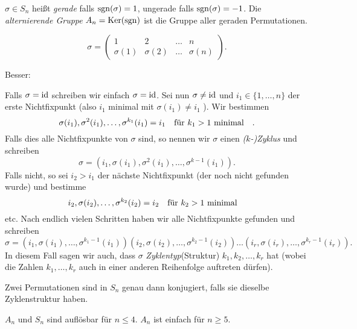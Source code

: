 \begin{definition}
	$\sigma \in S_{n}$ heißt \emph{gerade} falls $\operatorname{sgn}(\sigma) = 1$, ungerade falls $\operatorname{sgn}(\sigma) = -1$.
	Die \emph{alternierende Gruppe} $A_{n} = \operatorname{Ker}(\operatorname{sgn})$ ist die Gruppe aller geraden Permutationen.
\end{definition}


\begin{notation}
	\[
	\sigma = \begin{pmatrix} 
		1 & 2 & \ldots & n\\
		\sigma(1) & \sigma(2) & \ldots & \sigma(n)
	\end{pmatrix} 
	.\] 
\end{notation}
Besser:
\begin{notation}
	Falls $\sigma = \operatorname{id}$ schreiben wir einfach $\sigma = \operatorname{id}$.
	Sei nun $\sigma \neq \operatorname{id}$ und $i_1 \in \{1,\ldots,n\} $ der erste Nichtfixpunkt (also $i_{1}$ minimal mit $\sigma(i_1) \neq i_1$ ).
	Wir bestimmen
	\[
		\sigma(i_1) , \sigma^2(i_1),\ldots, \sigma^{k_1}(i_1) = i_1 \qq{für $k_1 > 1$ minimal}
	.\] 
	Falls dies alle Nichtfixpunkte von $\sigma$ sind, so nennen wir $\sigma$ einen \emph{($k$-)Zyklus} und schreiben
	 \[
		 \sigma = (i_1,\sigma(i_1),\sigma^2(i_1),\ldots,\sigma^{k-1}(i_1))
	.\] 
	Falls nicht, so sei $i_2 > i_1$ der nächste Nichtfixpunkt (der noch nicht gefunden wurde) und bestimme
	\[
		i_2, \sigma(i_2),\ldots, \sigma^{k_2}(i_2) = i_2 \qq{für $k_2 > 1$ minimal}
	\]
	etc. Nach endlich vielen Schritten haben wir alle Nichtfixpunkte gefunden  und schreiben 
	 \[
		 \sigma = (i_1,\sigma(i_1),\ldots,\sigma^{k_1-1}(i_1))(i_2,\sigma(i_2),\ldots,\sigma^{k_2-1}(i_2))\ldots(i_{r},\sigma(i_{r}),\ldots,\sigma^{k_{r}-1}(i_{r}))
	.\] 
	In diesem Fall sagen wir auch, dass $\sigma$ \emph{Zyklentyp}(Struktur) $k_1,k_2,\ldots,k_{r}$ hat (wobei
	die Zahlen $k_1,\ldots,k_{r}$ auch in einer anderen Reihenfolge auftreten dürfen).
\end{notation}


\begin{proposition}
	Zwei Permutationen sind in $S_{n}$ genau dann konjugiert, falls sie dieselbe Zyklenstruktur haben.
\end{proposition}



\begin{theorem}
	$A_{n}$ und $S_{n}$ sind auflösbar für $n \leq 4$.
	$A_{n}$ ist einfach für $n \geq 5$.
\end{theorem}


